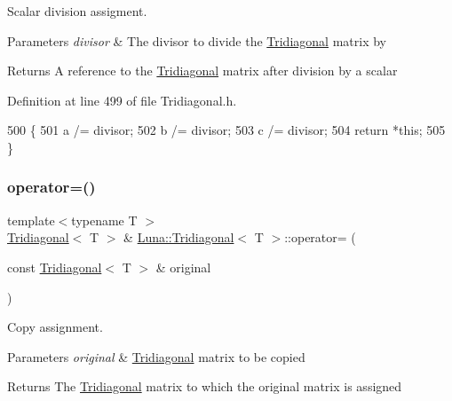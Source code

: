 Scalar division assigment. 


\begin{DoxyParams}{Parameters}
{\em divisor} & The divisor to divide the \hyperlink{classLuna_1_1Tridiagonal}{Tridiagonal} matrix by \\
\hline
\end{DoxyParams}
\begin{DoxyReturn}{Returns}
A reference to the \hyperlink{classLuna_1_1Tridiagonal}{Tridiagonal} matrix after division by a scalar 
\end{DoxyReturn}


Definition at line 499 of file Tridiagonal.\+h.


\begin{DoxyCode}
500   \{
501     a /= divisor;
502     b /= divisor;
503     c /= divisor;
504     \textcolor{keywordflow}{return} *\textcolor{keyword}{this};
505   \}
\end{DoxyCode}
\mbox{\label{classLuna_1_1Tridiagonal_a0118c1de81c85bd371d166390a4e5d4b}} 
\subsubsection{\texorpdfstring{operator=()}{operator=()}}
{\footnotesize\ttfamily template$<$typename T $>$ \\
\hyperlink{classLuna_1_1Tridiagonal}{Tridiagonal}$<$ T $>$ \& \hyperlink{classLuna_1_1Tridiagonal}{Luna\+::\+Tridiagonal}$<$ T $>$\+::operator= (\begin{DoxyParamCaption}\item[{const \hyperlink{classLuna_1_1Tridiagonal}{Tridiagonal}$<$ T $>$ \&}]{original }\end{DoxyParamCaption})\hspace{0.3cm}{\ttfamily [inline]}}



Copy assignment. 


\begin{DoxyParams}{Parameters}
{\em original} & \hyperlink{classLuna_1_1Tridiagonal}{Tridiagonal} matrix to be copied \\
\hline
\end{DoxyParams}
\begin{DoxyReturn}{Returns}
The \hyperlink{classLuna_1_1Tridiagonal}{Tridiagonal} matrix to which the original matrix is assigned 
\end{DoxyReturn}


